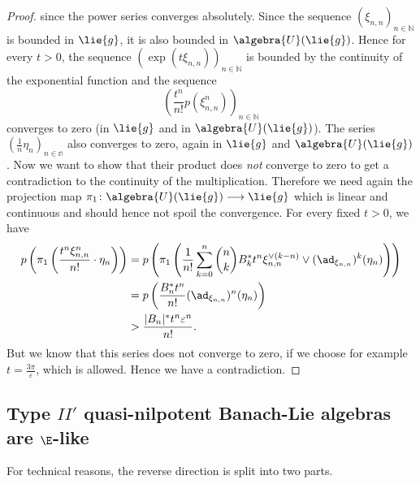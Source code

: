 \documentclass[
11pt,                          %
english                        %
]{article}
\begin{document}
\begin{proof}
	since the power series converges absolutely. Since the sequence $(\xi_{n,n})_{n 
	\in \mathbb{N}}$ is bounded in $\lie{g}$, it is also bounded in $\algebra{U}
	(\lie{g})$. Hence for every $t > 0$, the sequence $(\exp(t \xi_{n,n}))_{n \in 
	\mathbb{N}}$ is bounded by the continuity of the exponential function and the 
	sequence
	\begin{equation*}
		\left(
			\frac{t^n}{n!}
			p\left(
				\xi_{n,n}^n
			\right)
		\right)_{n \in \mathbb{N}}
	\end{equation*}
	converges to zero (in $\lie{g}$ and in $\algebra{U}(\lie{g})$). The series 
	$(\frac{1}{n} \eta_n)_{n \in \mathbb{n}}$ also converges to zero, again in 
	$\lie{g}$ and $\algebra{U}(\lie{g})$.
	Now we want to show that their product does \emph{not} converge to zero
	to get a contradiction to the continuity of the multiplication. Therefore
	we need again the projection map $\pi_1 \colon \algebra{U}(\lie{g}) 
	\longrightarrow \lie{g}$ which is linear and continuous and should hence not 
	spoil the convergence. For every fixed $t > 0$, we have
	\begin{align*}
		p \left(
			\pi_1\left(
				\frac{t^n \xi_{n,n}^n}{n!}
				\cdot
				\eta_n
			\right)
		\right)
		&=
		p\left(
			\pi_1 \left(
				\frac{1}{n!}
				\sum\limits_{k=0}^n
				\binom{n}{k}
				B_k^* t^n
				\xi_{n,n}^{\vee(k-n)}
				\vee
				(\ad_{\xi_{n,n}})^k(\eta_n)
			\right)
		\right)
		\\
		& =
		p\left(
			\frac{B_n^* t^n}{n!}
			(\ad_{\xi_{n,n}})^n(\eta_n)
		\right)
		\\
		& >
		\frac{|B_n|^* t^n \varepsilon^n}{n!}.
	\end{align*}
	But we know that this series does not converge to zero, if we choose for 
	example $t = \frac{3 \pi}{\varepsilon}$, which is allowed. Hence we have a 
	contradiction.
\end{proof}


\subsection{Type $II'$ quasi-nilpotent Banach-Lie algebras are $\E$-like}

For technical reasons, the reverse direction is split into two parts.
\end{document}
